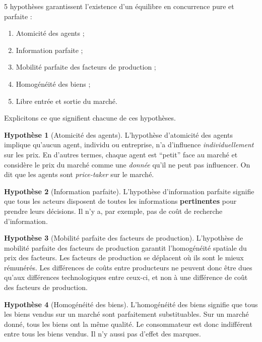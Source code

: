 \documentclass[
  a4paper,
]{book}
\providecommand{\tightlist}{%
  \setlength{\itemsep}{0pt}\setlength{\parskip}{0pt}}
\theoremstyle{definition}
\theoremstyle{definition}
\theoremstyle{definition}
\theoremstyle{definition}
\newtheorem{hypothesis}{Hypothèse}[chapter]
\theoremstyle{remark}
\begin{document}

5 hypothèses garantissent l'existence d'un équilibre en concurrence pure et parfaite :

\begin{enumerate}
\def\labelenumi{\arabic{enumi}.}
\tightlist
\item
  Atomicité des agents ;
\item
  Information parfaite ;
\item
  Mobilité parfaite des facteurs de production ;
\item
  Homogénéité des biens ;
\item
  Libre entrée et sortie du marché.
\end{enumerate}

Explicitons ce que signifient chacune de ces hypothèses.

\begin{hypothesis}[Atomicité des agents]
L'hypothèse d'atomicité des agents implique qu'aucun agent, individu ou entreprise, n'a d'influence \emph{individuellement} sur les prix.
En d'autres termes, chaque agent est ``petit'' face au marché et considère le prix du marché comme une \emph{donnée} qu'il ne peut pas influencer.
On dit que les agents sont \emph{price-taker} sur le marché.
\end{hypothesis}

\begin{hypothesis}[Information parfaite]
L'hypothèse d'information parfaite signifie que tous les acteurs disposent de toutes les informations \textbf{pertinentes} pour prendre leurs décisions.
Il n'y a, par exemple, pas de coût de recherche d'information.
\end{hypothesis}

\begin{hypothesis}[Mobilité parfaite des facteurs de production]
L'hypothèse de mobilité parfaite des facteurs de production garantit l'homogénéité spatiale du prix des facteurs.
Les facteurs de production se déplacent où ils sont le mieux rémunérés.
Les différences de coûts entre producteurs ne peuvent donc être dues qu'aux différences technologiques entre ceux-ci, et non à une différence de coût des facteurs de production.
\end{hypothesis}

\begin{hypothesis}[Homogénéité des biens]
L'homogénéité des biens signifie que tous les biens vendus sur un marché sont parfaitement substituables.
Sur un marché donné, tous les biens ont la même qualité.
Le consommateur est donc indifférent entre tous les biens vendus.
Il n'y aussi pas d'effet des marques.
\end{hypothesis}
\end{document}

